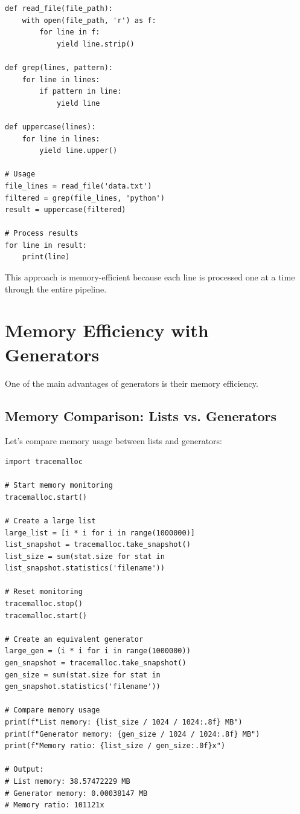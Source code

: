 \documentclass[12pt,letterpaper]{article}
\newenvironment{macterminal}{%
    \begin{mdframed}[
        linecolor=terminalFrame,
        backgroundcolor=terminalBg,
        roundcorner=5pt,
        skipabove=10pt,
        skipbelow=10pt,
        linewidth=1pt,
        innertopmargin=10pt, %
        frametitle={%
            \tikz[baseline=(current bounding box.east), outer sep=0pt]{
                \fill[red!80!black] (0,0) circle (5pt);
                \fill[yellow!80!black] (0.7,0) circle (5pt);
                \fill[green!70!black] (1.4,0) circle (5pt);
            }
        },
        frametitlealignment=\raggedright, %
        frametitleaboveskip=8pt, %
        frametitlebelowskip=0pt, %
    ]
}{%
    \end{mdframed}%
}
\begin{document}
\begin{macterminal}
\begin{lstlisting}
def read_file(file_path):
    with open(file_path, 'r') as f:
        for line in f:
            yield line.strip()

def grep(lines, pattern):
    for line in lines:
        if pattern in line:
            yield line

def uppercase(lines):
    for line in lines:
        yield line.upper()
        
# Usage
file_lines = read_file('data.txt')
filtered = grep(file_lines, 'python')
result = uppercase(filtered)

# Process results
for line in result:
    print(line)
\end{lstlisting}
\end{macterminal}

This approach is memory-efficient because each line is processed one at a time through the entire pipeline.

\section{Memory Efficiency with Generators}

One of the main advantages of generators is their memory efficiency.

\subsection{Memory Comparison: Lists vs. Generators}

Let's compare memory usage between lists and generators:

\begin{macterminal}
\begin{lstlisting}
import tracemalloc

# Start memory monitoring
tracemalloc.start()

# Create a large list
large_list = [i * i for i in range(1000000)]
list_snapshot = tracemalloc.take_snapshot()
list_size = sum(stat.size for stat in list_snapshot.statistics('filename'))

# Reset monitoring
tracemalloc.stop()
tracemalloc.start()

# Create an equivalent generator
large_gen = (i * i for i in range(1000000))
gen_snapshot = tracemalloc.take_snapshot()
gen_size = sum(stat.size for stat in gen_snapshot.statistics('filename'))

# Compare memory usage
print(f"List memory: {list_size / 1024 / 1024:.8f} MB")
print(f"Generator memory: {gen_size / 1024 / 1024:.8f} MB")
print(f"Memory ratio: {list_size / gen_size:.0f}x")

# Output:
# List memory: 38.57472229 MB
# Generator memory: 0.00038147 MB
# Memory ratio: 101121x
\end{lstlisting}
\end{macterminal}
\end{document}
